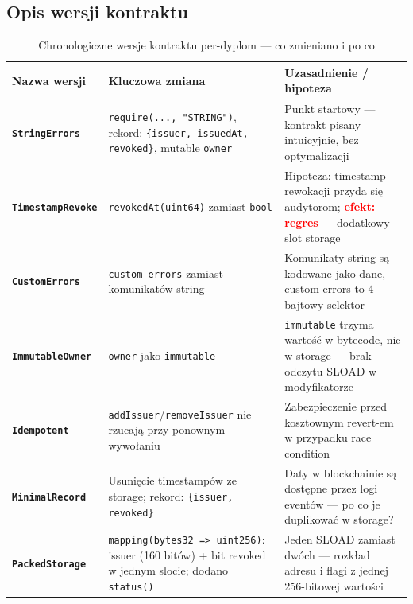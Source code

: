 \documentclass[11pt,a4paper]{article}
\begin{document}
\subsection{Opis wersji kontraktu}

\begin{table}[H]
\centering
\caption{Chronologiczne wersje kontraktu per-dyplom --- co zmieniano i po co}
\begin{tabular}{>{\bfseries}p{3.0cm} p{4.5cm} p{6.5cm}}
\toprule
Nazwa wersji & Kluczowa zmiana & Uzasadnienie / hipoteza \\
\midrule
\texttt{StringErrors}
  & \texttt{require(..., "STRING")}, \newline rekord: \texttt{\{issuer, issuedAt, revoked\}}, \newline mutable \texttt{owner}
  & Punkt startowy --- kontrakt pisany intuicyjnie, bez optymalizacji \\[6pt]

\texttt{TimestampRevoke}
  & \texttt{revokedAt(uint64)} zamiast \texttt{bool}
  & Hipoteza: timestamp rewokacji przyda się audytorom; \newline \textcolor{red}{\textbf{efekt: regres}} --- dodatkowy slot storage \\[6pt]

\texttt{CustomErrors}
  & \texttt{custom errors} zamiast komunikatów string
  & Komunikaty string są kodowane jako dane, \newline custom errors to 4-bajtowy selektor \\[6pt]

\texttt{ImmutableOwner}
  & \texttt{owner} jako \texttt{immutable}
  & \texttt{immutable} trzyma wartość w bytecode, \newline nie w storage --- brak odczytu SLOAD w modyfikatorze \\[6pt]

\texttt{Idempotent}
  & \texttt{addIssuer}/\texttt{removeIssuer} nie rzucają przy ponownym wywołaniu
  & Zabezpieczenie przed kosztownym revert-em \newline w przypadku race condition \\[6pt]

\texttt{MinimalRecord}
  & Usunięcie timestampów ze storage; \newline rekord: \texttt{\{issuer, revoked\}}
  & Daty w blockchainie są dostępne przez logi eventów --- \newline po co je duplikować w storage? \\[6pt]

\texttt{PackedStorage}
  & \texttt{mapping(bytes32 => uint256)}: \newline issuer (160 bitów) + bit revoked \newline w jednym slocie; dodano \texttt{status()}
  & Jeden SLOAD zamiast dwóch --- rozkład adresu \newline i flagi z jednej 256-bitowej wartości \\
\bottomrule
\end{tabular}
\end{table}
\end{document}

